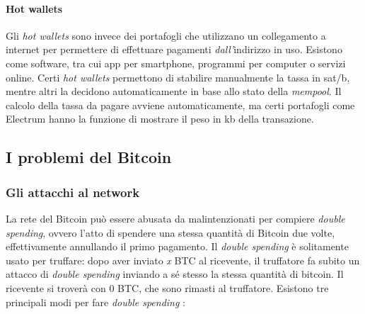 \documentclass {article}
\begin{document}
\paragraph {Hot wallets}

Gli \textit{hot wallets} sono invece dei portafogli che utilizzano un collegamento a internet per permettere di effettuare pagamenti \emph{dall'}indirizzo in uso.
Esistono come software, tra cui app per smartphone, programmi per computer o servizi online.
Certi \textit{hot wallets} permettono di stabilire manualmente la tassa in sat/b, mentre altri la decidono automaticamente in base allo stato della \textit{mempool}.
Il calcolo della tassa da pagare avviene automaticamente, ma certi portafogli come Electrum hanno la funzione di mostrare il peso in kb della transazione.


\subsection {I problemi del Bitcoin}


\subsubsection {Gli attacchi al network}


La rete del Bitcoin può essere abusata da malintenzionati per compiere \textit{double spending}, ovvero l'atto di spendere una stessa quantità di Bitcoin due volte, effettivamente annullando il primo pagamento.
Il \textit{double spending} è solitamente usato per truffare: dopo aver inviato \textit{x} BTC al ricevente, il truffatore fa subito un attacco di \textit{double spending} inviando a sé stesso la stessa quantità di bitcoin. Il ricevente si troverà con 0 BTC, che sono rimasti al truffatore.
Esistono tre principali modi per fare \textit{double spending} \cite{attacks}:
\end{document}
